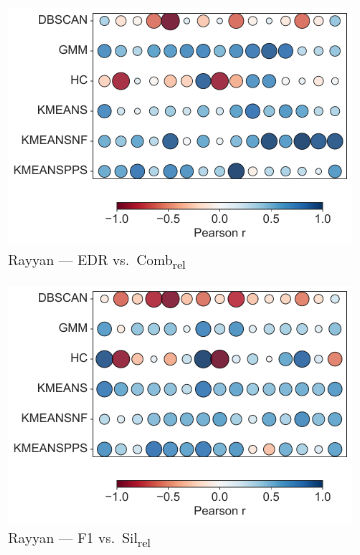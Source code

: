 \documentclass[10pt]{article} %
\numberwithin{equation}{section}
\begin{document}
\begin{enumerate}[label=(\alph*)]
\begin{figure}[H]
  \begin{subfigure}[b]{0.33\linewidth}
    \includegraphics[width=\linewidth]{figures/6.4.3graph/RA_EDR_vs_Comb_relative.pdf}
    \caption{Rayyan — EDR vs.\ Comb\textsubscript{rel}}
    \label{fig:ra_edr_comb}
  \end{subfigure}\hfill
  \begin{subfigure}[b]{0.33\linewidth}
    \includegraphics[width=\linewidth]{figures/6.4.3graph/RA_F1_vs_Sil_relative.pdf}
    \caption{Rayyan — F1 vs.\ Sil\textsubscript{rel}}
    \label{fig:ra_f1_sil}
  \end{subfigure}\hfill
  \begin{subfigure}[b]{0.33\linewidth}

\end{subfigure}
\end{figure}
\end{enumerate}
\end{document}
